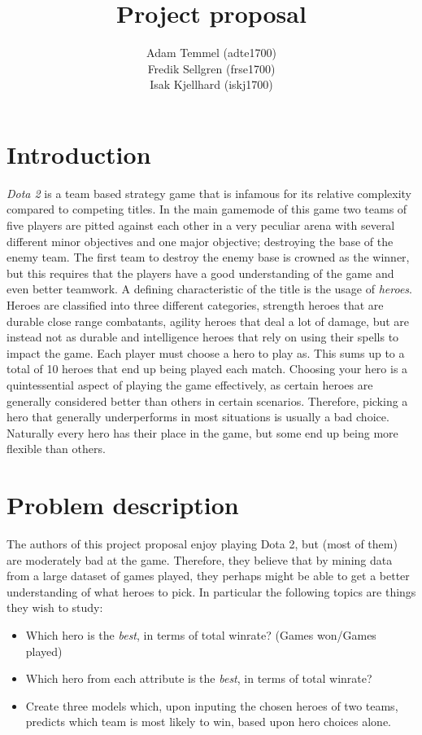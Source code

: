 \documentclass[a4paper, titlepage,12pt]{article}
\title{Project proposal}
\author{Adam Temmel (adte1700)\\ Fredik Sellgren (frse1700)\\Isak Kjellhard (iskj1700)}
\begin{document}
	\maketitle
	\section{Introduction}\label{sec:introduction}
		\textit{Dota 2} is a team based strategy game that is infamous for its relative complexity compared to competing titles. In the main gamemode of this game two teams of five players are pitted against each other in a very peculiar arena with several different minor objectives and one major objective; destroying the base of the enemy team. The first team to destroy the enemy base is crowned as the winner, but this requires that the players have a good understanding of the game and even better teamwork. A defining characteristic of the title is the usage of \textit{heroes}. Heroes are classified into three different categories, strength heroes that are durable close range combatants, agility heroes that deal a lot of damage, but are instead not as durable and intelligence heroes that rely on using their spells to impact the game. Each player must choose a hero to play as. This sums up to a total of 10 heroes that end up being played each match. Choosing your hero is a quintessential aspect of playing the game effectively, as certain heroes are generally considered better than others in certain scenarios. Therefore, picking a hero that generally underperforms in most situations is usually a bad choice. Naturally every hero has their place in the game, but some end up being more flexible than others.
	\section{Problem description}\label{sec:problem}
		The authors of this project proposal enjoy playing Dota 2, but (most of them) are moderately bad at the game. Therefore, they believe that by mining data from a large dataset of games played, they perhaps might be able to get a better understanding of what heroes to pick. In particular the following topics are things they wish to study:
		\begin{itemize}
			\item Which hero is the \textit{best}, in terms of total winrate? (Games won/Games played)
			\item Which hero from each attribute is the \textit{best}, in terms of total winrate?
			\item Create three models which, upon inputing the chosen heroes of two teams, predicts which team is most likely to win, based upon hero choices alone.
		\end{itemize}
\end{document}
